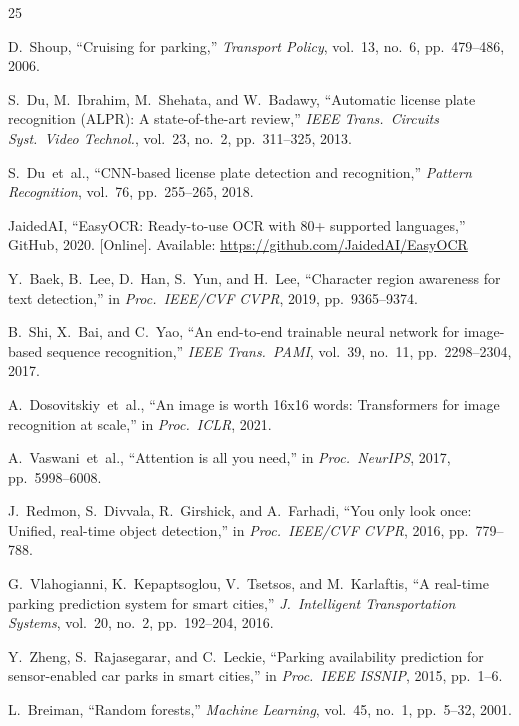 \documentclass[conference,10pt]{IEEEtran}
\begin{document}
\begin{thebibliography}{25}

D.~Shoup, ``Cruising for parking,'' \emph{Transport Policy}, vol.~13, no.~6, pp.~479--486, 2006.

S.~Du, M.~Ibrahim, M.~Shehata, and W.~Badawy, ``Automatic license plate recognition (ALPR): A state-of-the-art review,'' \emph{IEEE Trans.\ Circuits Syst.\ Video Technol.}, vol.~23, no.~2, pp.~311--325, 2013.

S.~Du~et~al., ``CNN-based license plate detection and recognition,'' \emph{Pattern Recognition}, vol.~76, pp.~255--265, 2018.

JaidedAI, ``EasyOCR: Ready-to-use OCR with 80+ supported languages,'' GitHub, 2020. [Online]. Available: \url{https://github.com/JaidedAI/EasyOCR}

Y.~Baek, B.~Lee, D.~Han, S.~Yun, and H.~Lee, ``Character region awareness for text detection,'' in \emph{Proc.\ IEEE/CVF CVPR}, 2019, pp.~9365--9374.

B.~Shi, X.~Bai, and C.~Yao, ``An end-to-end trainable neural network for image-based sequence recognition,'' \emph{IEEE Trans.\ PAMI}, vol.~39, no.~11, pp.~2298--2304, 2017.

A.~Dosovitskiy~et~al., ``An image is worth 16x16 words: Transformers for image recognition at scale,'' in \emph{Proc.\ ICLR}, 2021.

A.~Vaswani~et~al., ``Attention is all you need,'' in \emph{Proc.\ NeurIPS}, 2017, pp.~5998--6008.

J.~Redmon, S.~Divvala, R.~Girshick, and A.~Farhadi, ``You only look once: Unified, real-time object detection,'' in \emph{Proc.\ IEEE/CVF CVPR}, 2016, pp.~779--788.

G.~Vlahogianni, K.~Kepaptsoglou, V.~Tsetsos, and M.~Karlaftis, ``A real-time parking prediction system for smart cities,'' \emph{J.\ Intelligent Transportation Systems}, vol.~20, no.~2, pp.~192--204, 2016.

Y.~Zheng, S.~Rajasegarar, and C.~Leckie, ``Parking availability prediction for sensor-enabled car parks in smart cities,'' in \emph{Proc.\ IEEE ISSNIP}, 2015, pp.~1--6.

L.~Breiman, ``Random forests,'' \emph{Machine Learning}, vol.~45, no.~1, pp.~5--32, 2001.


\end{thebibliography}
\end{document}
